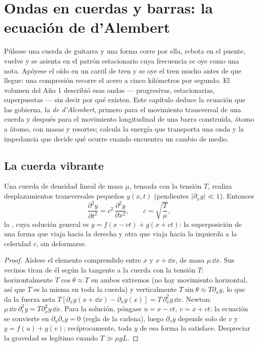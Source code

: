 \chapter{Ondas en cuerdas y barras: la ecuación de d'Alembert}\label{ch:b2:waves-on-strings}

Púlsese una cuerda de guitarra y una forma corre por ella, rebota en el
puente, vuelve y se asienta en el patrón estacionario cuya frecuencia se
oye como una nota. Apóyese el oído en un carril de tren y se oye el tren
mucho antes de que llegue: una compresión recorre el acero a cinco
kilómetros por segundo. El volumen del Año 1 describió esas ondas ---
progresivas, estacionarias, superpuestas --- sin decir por qué existen.
Este capítulo deduce la ecuación que las gobierna, la \emph{ de d'Alembert}, primero para el movimiento transversal de una cuerda
y después para el movimiento longitudinal de una barra construida, átomo a
átomo, con masas y resortes; calcula la energía que transporta una onda y
la impedancia que decide qué ocurre cuando encuentra un cambio de medio.

\section{La cuerda vibrante}

\begin{theorem}\label{thm:b2:waves-on-strings:equation}
Una cuerda de densidad lineal de masa $\mu$, tensada con la tensión $T$,
realiza desplazamientos transversales pequeños $y(x, t)$ (pendientes $|\partial_xy| \ll 1$). Entonces
\[
\frac{\partial^2y}{\partial t^2} = c^2\,\frac{\partial^2y}{\partial x^2} ,
\qquad c = \sqrt{\frac{T}{\mu}} ,
\]
la \emph{}, cuya solución general es $y = f(x - ct)
+ g(x + ct)$: la superposición de una forma que viaja hacia la derecha y
otra que viaja hacia la izquierda a la celeridad $c$, sin deformarse.
\end{theorem}

\begin{proof}
Aíslese el elemento comprendido entre $x$ y $x + \dd x$, de masa $\mu\,\dd x$. Sus
vecinos tiran de él según la tangente a la cuerda con la tensión $T$:
horizontalmente $T\cos\theta \approx T$ en ambos extremos (no hay movimiento horizontal, así que
$T$ es la misma en toda la cuerda) y verticalmente $T\sin\theta \approx T\partial_xy$, lo que
da la fuerza neta $T[\partial_xy(x + \dd x) - \partial_xy(x)] = T\,\partial_x^2y\,\dd x$.
Newton: $\mu\,\dd x\,\partial_t^2y = T\partial_x^2y\,\dd x$. Para la solución, póngase
$u = x - ct$, $v = x + ct$: la ecuación se convierte en $\partial_u\partial_vy = 0$
(regla de la cadena), luego $\partial_vy$ depende solo de $v$ y $y = f(u) + g(v)$;
recíprocamente, toda $y$ de esa forma la satisface. Despreciar la gravedad
es legítimo cuando $T \gg \mu gL$.
\end{proof}

